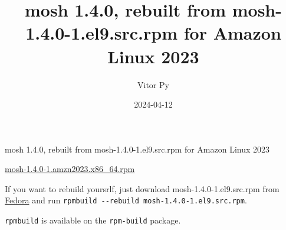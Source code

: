 \documentclass{article}
\title{mosh 1.4.0, rebuilt from mosh-1.4.0-1.el9.src.rpm for Amazon Linux 2023}
\author{Vitor Py}
\date{2024-04-12}
\begin{document}

\maketitle

mosh 1.4.0, rebuilt from mosh-1.4.0-1.el9.src.rpm for Amazon Linux 2023

\href{https://drive.google.com/file/d/1DIOphzs4XtLVwSZA2XG0HjaoNbTE5l-V/view?usp=sharing}{mosh-1.4.0-1.amzn2023.x86\_64.rpm}

If you want to rebuild yoursrlf, just download mosh-1.4.0-1.el9.src.rpm from \href{https://src.fedoraproject.org/rpms/mosh}{Fedora} and run \texttt{rpmbuild -{}-rebuild mosh-1.4.0-1.el9.src.rpm}.

\texttt{rpmbuild} is available on the \texttt{rpm-build} package.


\end{document}
